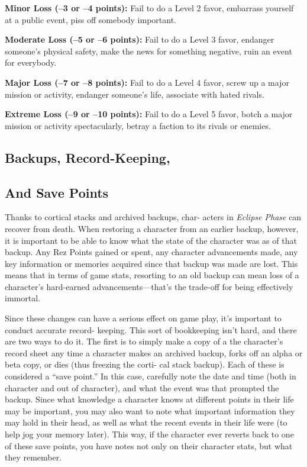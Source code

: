 \textbf{Minor Loss (–3 or –4 points):} Fail to do a Level 2 
favor, embarrass yourself at a public event, piss off 
somebody important.

\textbf{Moderate Loss (–5 or –6 points):} Fail to do a Level 
3 favor, endanger someone's physical safety, make 
the news for something negative, ruin an event for 
everybody.

\textbf{Major Loss (–7 or –8 points):} Fail to do a Level 4 
favor, screw up a major mission or activity, endanger 
someone's life, associate with hated rivals.

\textbf{Extreme Loss (–9 or –10 points):} Fail to do a Level 
5 favor, botch a major mission or activity spectacularly, 
betray a faction to its rivals or enemies.

\subsection{Backups, Record-Keeping,}


\subsection{And Save Points}

Thanks to cortical stacks and archived backups, char-
acters in \textit{Eclipse Phase} can recover from death. When 
restoring a character from an earlier backup, however, 
it is important to be able to know what the state of 
the character was as of that backup. Any Rez Points 
gained or spent, any character advancements made, 
any key information or memories acquired since that 
backup was made are lost. This means that in terms of 
game stats, resorting to an old backup can mean loss 
of a character's hard-earned advancements—that's the 
trade-off for being effectively immortal.

Since these changes can have a serious effect on 
game play, it's important to conduct accurate record-
keeping. This sort of bookkeeping isn't hard, and 
there are two ways to do it. The first is to simply 
make a copy of a the character's record sheet any 
time a character makes an archived backup, forks off 
an alpha or beta copy, or dies (thus freezing the corti-
cal stack backup). Each of these is considered a ``save 
point.'' In this case, carefully note the date and time 
(both in character and out of character), and what 
the event was that prompted the backup. Since what 
knowledge a character knows at different points in 
their life may be important, you may also want to 
note what important information they may hold in 
their head, as well as what the recent events in their 
life were (to help jog your memory later). This way, 
if the character ever reverts back to one of these save 
points, you have notes not only on their character 
stats, but what they remember.

